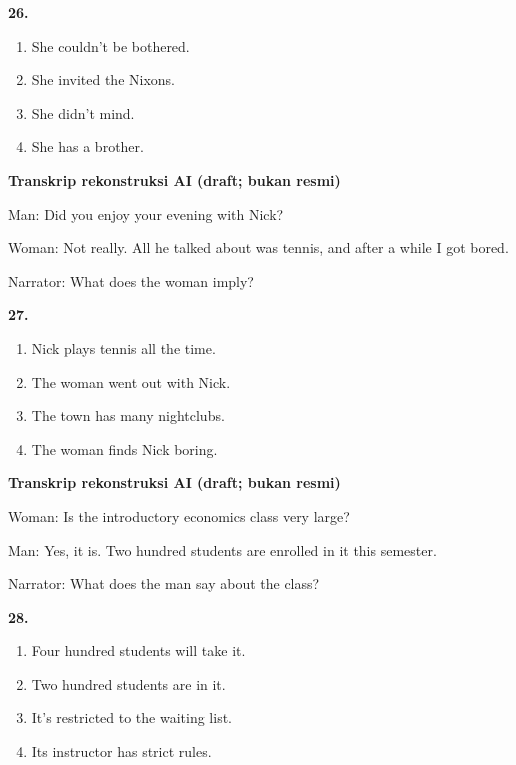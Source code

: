 \documentclass[12pt]{article}
\begin{document}
\noindent\textbf{26.}
\begin{enumerate}[label=(\Alph*),leftmargin=*,itemsep=0.2em]
\item She couldn't be bothered.
\item She invited the Nixons.
\item She didn't mind.
\item She has a brother.
\end{enumerate}
\par
\vspace{0.25\baselineskip}
\begin{exampleblock}
\textbf{Transkrip rekonstruksi AI (draft; bukan resmi)}\par
Man: Did you enjoy your evening with Nick?\par
Woman: Not really. All he talked about was tennis, and after a while I got bored.\par
Narrator: What does the woman imply?\par
\end{exampleblock}
\noindent\textbf{27.}
\begin{enumerate}[label=(\Alph*),leftmargin=*,itemsep=0.2em]
\item Nick plays tennis all the time.
\item The woman went out with Nick.
\item The town has many nightclubs.
\item The woman finds Nick boring.
\end{enumerate}
\par
\vspace{0.25\baselineskip}
\begin{exampleblock}
\textbf{Transkrip rekonstruksi AI (draft; bukan resmi)}\par
Woman: Is the introductory economics class very large?\par
Man: Yes, it is. Two hundred students are enrolled in it this semester.\par
Narrator: What does the man say about the class?\par
\end{exampleblock}
\noindent\textbf{28.}
\begin{enumerate}[label=(\Alph*),leftmargin=*,itemsep=0.2em]
\item Four hundred students will take it.
\item Two hundred students are in it.
\item It's restricted to the waiting list.
\item Its instructor has strict rules.
\end{enumerate}
\end{document}
